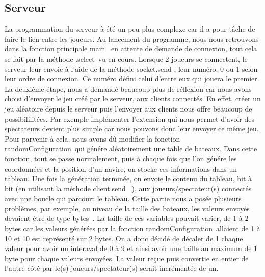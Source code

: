 \documentclass{article}
\begin{document}
	\subsection{Serveur}
	La programmation du serveur \`a \'et\'e un peu plus complexe car il a pour t\^ache de faire le lien entre les joueurs. 
	\newline Au lancement du programme, nous nous retrouvons dans la fonction principale \guillemotleft main \guillemotright\ en attente de demande de connexion, tout cela se fait par la m\'ethode
	\guillemotleft.select\guillemotright \ vu en cours. 
	Lorsque 2 joueurs se connectent, le serveur leur envoie \`a l\textquoteright aide de la m\'ethode \guillemotleft socket.send \guillemotright , leur num\'ero, 0 ou 1 selon leur ordre de connexion. Ce num\'ero d\'efini celui d'entre eux qui jouera le premier.
	\newline La deuxième \'etape, nous a demand\'e beaucoup plus de r\'eflexion car nous avons choisi d'envoyer le jeu cr\'e\'e par le serveur, aux clients connect\'es.
	\newline En effet, cr\'eer un jeu al\'eatoire depuis le serveur puis l\textquoteright envoyer aux clients nous offre beaucoup de possibililit\'ees. Par exemple impl\'ementer l\textquoteright extension qui nous permet d'avoir des spectateurs devient plus simple car nous pouvons donc leur envoyer ce m\^eme jeu.
	\newline Pour parvenir \`a cela, nous avons d\^u  modifier la fonction \guillemotleft randomConfiguration\guillemotright \ qui g\'en\'ere al\'eatoirement une table de bateaux.
	\newline Dans cette fonction, tout se passe normalement, puis \`a chaque fois que l\textquoteright on g\'en\'ere les coordonn\'ees et la position d\textquoteright un navire, on stocke ces informations dans un tableau. Une fois la g\'en\'eration termin\'ee, on envoie le contenu du tableau, bit \`a bit (en utilisant la m\'ethode \guillemotleft client.send \guillemotright \ ), aux joueurs/spectateur(s) connect\'es avec une boucle qui parcourt le tableau.
	\newline Cette partie nous a pos\'ee plusieurs probl\`emes, par exemple, au niveau de la taille des bateaux, les valeurs envoy\'es devaient \^etre de type \guillemotleft bytes\guillemotright\ . La taille de ces variables pouvait varier, de 1 \`a 2 bytes car les valeurs g\'en\'er\'ees par la fonction  \guillemotleft randomConfiguration\guillemotright\ allaient de  1 \`a 10 et 10 est repr\'esent\'e sur 2 bytes. On a donc d\'ecid\'e de d\'ecaler de 1 chaque valeur pour avoir un interaval de 0 \`a 9 et ainsi avoir une taille au maximum de 1 byte pour chaque valeurs envoy\'ees. La valeur re\c cue puis convertie en entier de l\textquoteright autre c\^ot\'e par le(s) joueurs/spectateur(s) serait incr\'ement\'ee de un. 
\end{document}
